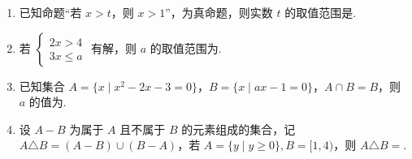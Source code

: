 \documentclass[a4paper,11pt]{article}
\begin{document}
\begin{enumerate}
\item 已知命题“若 $x>t$，则 $x>1$”，为真命题，则实数 $t$ 的取值范围是\blankline[4.4em].

\ifanswer
\solbegin
{}
\solend
\fi

\item 若 $\begin{cases}2x>4\\ 3x\leqslant a\end{cases}$ 有解，则 $a$ 的取值范围为\blankline[4.4em].

\ifanswer
{}
\fi

\item 已知集合 $A=\{x\mid x^2-2x-3=0\}$，$B=\{x\mid ax-1=0\}$，$A\cap B=B$，则 $a$ 的值为\blankline[4.4em].

\ifanswer
\solbegin
{}
\solend
\fi

\item 设 $A-B$ 为属于 $A$ 且不属于 $B$ 的元素组成的集合，记 $A\triangle B=(A-B)\cup(B-A)$，若 $A=\{y\mid y\geqslant0\},B=[1,4)$，则 $A\triangle B=$\blankline[4.4em].

\ifanswer
\ans{$[0,1)\cup[4,+\infty)$}
\fi

\end{enumerate}

\end{document}
